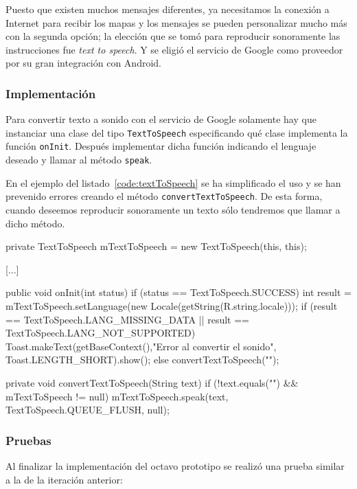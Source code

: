 Puesto que existen muchos mensajes diferentes, ya necesitamos la conexión a Internet para recibir
los mapas y los mensajes se pueden personalizar mucho más con la segunda opción; la elección que se
tomó para reproducir sonoramente las instrucciones fue \emph{text to speech}. Y se eligió el
servicio de Google como proveedor por su gran integración con Android.

\subsubsection{Implementación}

Para convertir texto a sonido con el servicio de Google solamente hay que instanciar una clase del
tipo \texttt{TextToSpeech} especificando qué clase implementa la función \texttt{onInit}. Después
implementar dicha función indicando el lenguaje deseado y llamar al método \texttt{speak}.

En el ejemplo del listado~\ref{code:textToSpeech} se ha simplificado el uso y se han prevenido
errores creando el método \texttt{convertTextToSpeech}. De esta forma, cuando deseemos reproducir
sonoramente un texto sólo tendremos que llamar a dicho método.

\begin{listing}[
  float=ht,
  language = java,
  caption  = {Ejemplo del uso de \texttt{TextToSpeech}},
  label    = code:textToSpeech]
private TextToSpeech mTextToSpeech = new TextToSpeech(this, this);

[...]

public void onInit(int status) {
  if (status == TextToSpeech.SUCCESS) {
    int result = mTextToSpeech.setLanguage(new Locale(getString(R.string.locale)));
    if (result == TextToSpeech.LANG_MISSING_DATA || result == TextToSpeech.LANG_NOT_SUPPORTED) {
      Toast.makeText(getBaseContext(),"Error al convertir el sonido", Toast.LENGTH_SHORT).show();
    } else {
      convertTextToSpeech("");
    }
  } 
}

private void convertTextToSpeech(String text) {
  if (!text.equals("") && mTextToSpeech != null) {
    mTextToSpeech.speak(text, TextToSpeech.QUEUE_FLUSH, null);
  }
}
\end{listing}
\subsubsection{Pruebas}

Al finalizar la implementación del octavo prototipo se realizó una prueba similar a la de la
iteración anterior:

